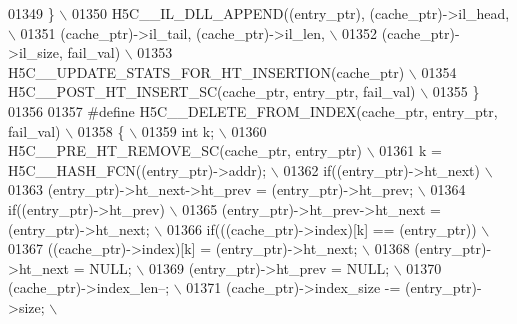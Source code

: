 \begin{DoxyCode}
01349 \textcolor{preprocessor}{    \}                                                                        \(\backslash\)}
01350 \textcolor{preprocessor}{    H5C\_\_IL\_DLL\_APPEND((entry\_ptr), (cache\_ptr)->il\_head,                    \(\backslash\)}
01351 \textcolor{preprocessor}{                       (cache\_ptr)->il\_tail, (cache\_ptr)->il\_len,            \(\backslash\)}
01352 \textcolor{preprocessor}{                       (cache\_ptr)->il\_size, fail\_val)                       \(\backslash\)}
01353 \textcolor{preprocessor}{    H5C\_\_UPDATE\_STATS\_FOR\_HT\_INSERTION(cache\_ptr)                            \(\backslash\)}
01354 \textcolor{preprocessor}{    H5C\_\_POST\_HT\_INSERT\_SC(cache\_ptr, entry\_ptr, fail\_val)                   \(\backslash\)}
01355 \textcolor{preprocessor}{\}}
01356 
01357 \textcolor{preprocessor}{#define H5C\_\_DELETE\_FROM\_INDEX(cache\_ptr, entry\_ptr, fail\_val)               \(\backslash\)}
01358 \textcolor{preprocessor}{\{                                                                            \(\backslash\)}
01359 \textcolor{preprocessor}{    int k;                                                                   \(\backslash\)}
01360 \textcolor{preprocessor}{    H5C\_\_PRE\_HT\_REMOVE\_SC(cache\_ptr, entry\_ptr)                              \(\backslash\)}
01361 \textcolor{preprocessor}{    k = H5C\_\_HASH\_FCN((entry\_ptr)->addr);                                    \(\backslash\)}
01362 \textcolor{preprocessor}{    if((entry\_ptr)->ht\_next)                                                 \(\backslash\)}
01363 \textcolor{preprocessor}{        (entry\_ptr)->ht\_next->ht\_prev = (entry\_ptr)->ht\_prev;                \(\backslash\)}
01364 \textcolor{preprocessor}{    if((entry\_ptr)->ht\_prev)                                                 \(\backslash\)}
01365 \textcolor{preprocessor}{        (entry\_ptr)->ht\_prev->ht\_next = (entry\_ptr)->ht\_next;                \(\backslash\)}
01366 \textcolor{preprocessor}{    if(((cache\_ptr)->index)[k] == (entry\_ptr))                               \(\backslash\)}
01367 \textcolor{preprocessor}{        ((cache\_ptr)->index)[k] = (entry\_ptr)->ht\_next;                      \(\backslash\)}
01368 \textcolor{preprocessor}{    (entry\_ptr)->ht\_next = NULL;                                             \(\backslash\)}
01369 \textcolor{preprocessor}{    (entry\_ptr)->ht\_prev = NULL;                                             \(\backslash\)}
01370 \textcolor{preprocessor}{    (cache\_ptr)->index\_len--;                                                \(\backslash\)}
01371 \textcolor{preprocessor}{    (cache\_ptr)->index\_size -= (entry\_ptr)->size;                            \(\backslash\)}

\end{DoxyCode}
